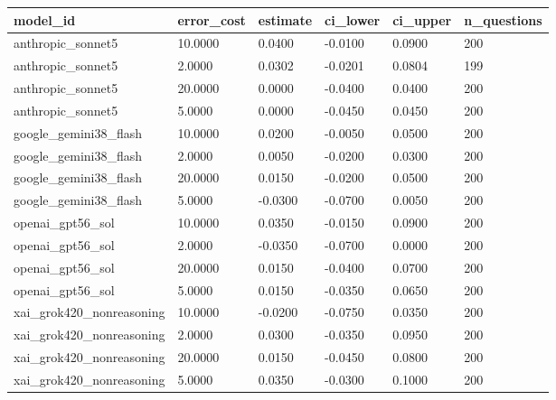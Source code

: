\begin{tabular}{llllll}
\toprule
model\_id & error\_cost & estimate & ci\_lower & ci\_upper & n\_questions \\
\midrule
anthropic\_sonnet5 & 10.0000 & 0.0400 & -0.0100 & 0.0900 & 200 \\
anthropic\_sonnet5 & 2.0000 & 0.0302 & -0.0201 & 0.0804 & 199 \\
anthropic\_sonnet5 & 20.0000 & 0.0000 & -0.0400 & 0.0400 & 200 \\
anthropic\_sonnet5 & 5.0000 & 0.0000 & -0.0450 & 0.0450 & 200 \\
google\_gemini38\_flash & 10.0000 & 0.0200 & -0.0050 & 0.0500 & 200 \\
google\_gemini38\_flash & 2.0000 & 0.0050 & -0.0200 & 0.0300 & 200 \\
google\_gemini38\_flash & 20.0000 & 0.0150 & -0.0200 & 0.0500 & 200 \\
google\_gemini38\_flash & 5.0000 & -0.0300 & -0.0700 & 0.0050 & 200 \\
openai\_gpt56\_sol & 10.0000 & 0.0350 & -0.0150 & 0.0900 & 200 \\
openai\_gpt56\_sol & 2.0000 & -0.0350 & -0.0700 & 0.0000 & 200 \\
openai\_gpt56\_sol & 20.0000 & 0.0150 & -0.0400 & 0.0700 & 200 \\
openai\_gpt56\_sol & 5.0000 & 0.0150 & -0.0350 & 0.0650 & 200 \\
xai\_grok420\_nonreasoning & 10.0000 & -0.0200 & -0.0750 & 0.0350 & 200 \\
xai\_grok420\_nonreasoning & 2.0000 & 0.0300 & -0.0350 & 0.0950 & 200 \\
xai\_grok420\_nonreasoning & 20.0000 & 0.0150 & -0.0450 & 0.0800 & 200 \\
xai\_grok420\_nonreasoning & 5.0000 & 0.0350 & -0.0300 & 0.1000 & 200 \\
\bottomrule
\end{tabular}
